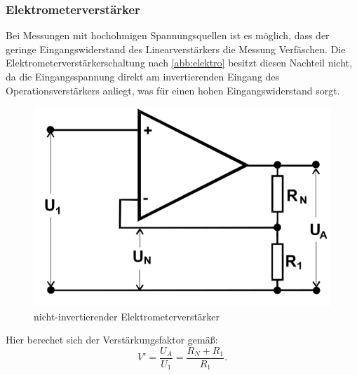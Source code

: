\subsubsection{Elektrometerverst{\"a}rker}
Bei Messungen mit hochohmigen Spannungsquellen ist es möglich, dass der geringe Eingangswiderstand des Linearverstärkers die Messung Verfäschen. Die
Elektrometerverstärkerschaltung nach \autoref{abb:elektro} besitzt diesen Nachteil nicht, da die Eingangsspannung direkt am invertierenden Eingang des Operationsverstärkers anliegt, was für einen hohen Eingangswiderstand
sorgt.
\begin{figure}[h!]
 	\centering
 	\includegraphics[width=\textwidth]{img/elec.png}
 	\caption{nicht-invertierender Elektrometerverstärker \cite{FP}}
 	\label{abb:elektro}
\end{figure}
Hier berechet sich der Verstärkungsfaktor gemäß:
\begin{equation}
V' = \frac{U_A}{U_1}=\frac{R_N + R_1}{R_1}.
\end{equation}


